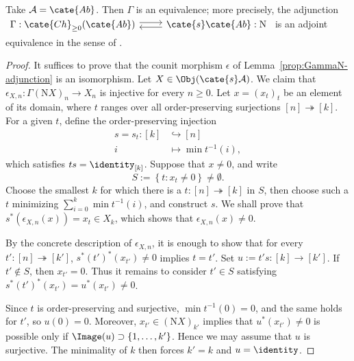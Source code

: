 \begin{lemma}\label{prop:DK-Ab}
	Take $\mathcal{A}=\cate{Ab}$. Then $\Gamma$ is an equivalence; more
	precisely, the adjunction
	$\begin{tikzcd}
		\Gamma: \cate{Ch}_{\geq 0}(\cate{Ab}) \arrow[shift left, r] & \cate{s}\cate{Ab} : \mathrm{N} \arrow[shift left, l]
	\end{tikzcd}$
	is an adjoint equivalence in the sense of
	\cite[Theorem 2.6.12]{Li1}.
\end{lemma}
\begin{proof}
	It suffices to prove that the counit morphism $\epsilon$ of
	Lemma~\ref{prop:GammaN-adjunction} is an isomorphism. Let
	$X\in\Obj(\cate{s}\mathcal{A})$. We claim that
	$\epsilon_{X,n}:\Gamma(\mathrm{N}X)_n\to X_n$ is injective for every
	$n\geq0$. Let $x=(x_t)_t$ be an element of its domain, where $t$ ranges
	over all order-preserving surjections $[n]\twoheadrightarrow[k]$. For a
	given $t$, define the order-preserving injection
	\begin{align*}
		s = s_t : [k] & \hookrightarrow [n] \\
		i & \mapsto \min t^{-1}(i),
	\end{align*}
	which satisfies $ts=\identity_{[k]}$. Suppose that $x\neq0$, and write
	\[ S := \left\{t: x_t \neq 0 \right\} \neq \emptyset. \]
	Choose the smallest $k$ for which there is a
	$t:[n]\twoheadrightarrow[k]$ in $S$, then choose such a $t$ minimizing
	$\sum_{i=0}^k\min t^{-1}(i)$, and construct $s$. We shall prove that
	$s^*(\epsilon_{X,n}(x))=x_t\in X_k$, which shows that
	$\epsilon_{X,n}(x)\neq0$.

	By the concrete description of $\epsilon_{X,n}$, it is enough to show
	that for every $t':[n]\twoheadrightarrow[k']$,
	$s^*(t')^*(x_{t'})\neq0$ implies $t=t'$. Set
	$u:=t's:[k]\to[k']$. If $t'\notin S$, then $x_{t'}=0$. Thus it remains
	to consider $t'\in S$ satisfying
	$s^*(t')^*(x_{t'})=u^*(x_{t'})\neq0$.

	Since $t$ is order-preserving and surjective, $\min t^{-1}(0)=0$, and
	the same holds for $t'$, so $u(0)=0$. Moreover,
	$x_{t'}\in(\mathrm{N}X)_{k'}$ implies that
	$u^*(x_{t'})\neq0$ is possible only if
	$\Image(u)\supset\{1,\ldots,k'\}$. Hence we may assume that $u$ is
	surjective. The minimality of $k$ then forces $k'=k$ and
	$u=\identity$.


\end{proof}
